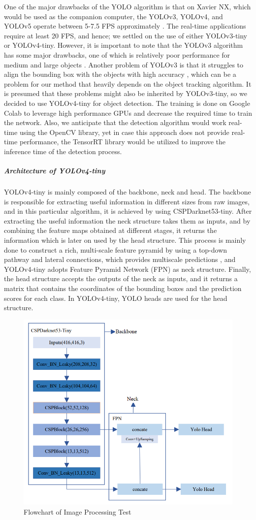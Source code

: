 \documentclass[12pt]{article}
\begin{document}
\justify One of the major drawbacks of the YOLO algorithm is that on Xavier NX, which would be used as the companion computer, the YOLOv3, YOLOv4, and YOLOv5 operate between 5-7.5 FPS approximately \cite{redmon2016you}. The real-time applications require at least 20 FPS, and hence; we settled on the use of either YOLOv3-tiny or YOLOv4-tiny. However, it is important to note that the YOLOv3 algorithm has some major drawbacks, one of which is relatively poor performance for medium and large objects \cite{zhang2018fast}. Another problem of YOLOv3 is that it struggles to align the bounding box with the objects with high accuracy \cite{zhang2018fast}, which can be a problem for our method that heavily depends on the object tracking algorithm. It is presumed that these problems might also be inherited by YOLOv3-tiny, so we decided to use YOLOv4-tiny for object detection. The training is done on Google Colab to leverage high performance GPUs and decrease the required time to train the network.  Also, we anticipate that the detection algorithm would work real-time using the OpenCV library, yet in case this approach does not provide real-time performance, the TensorRT library would be utilized to improve the inference time of the detection process.

\subparagraph*{Architecture of YOLOv4-tiny}

\justify YOLOv4-tiny is mainly composed of the backbone, neck and head. The backbone is responsible for extracting useful information in different sizes from raw images, and in this particular algorithm, it is achieved by using CSPDarknet53-tiny. After extracting the useful information the neck structure takes them as inputs, and by combining the feature maps obtained at different stages, it returns the information which is later on used by the head structure. This process is mainly done to construct a rich, multi-scale feature pyramid by using a top-down pathway and lateral connections, which provides multiscale predictions \cite{bertinetto2016fully}, and YOLOv4-tiny adopts Feature Pyramid Network (FPN) as neck structure. Finally, the head structure accepts the outputs of the neck as inputs, and it returns a matrix that contains the coordinates of the bounding boxes and the prediction scores for each class. In YOLOv4-tiny, YOLO heads are used for the head structure. 
\begin{figure}[ht]
\centering
 	\includegraphics[width = .6\linewidth]{ip_blockdiagram.png}
 	\caption{Flowchart of Image Processing Test \cite{lin2017focal}}
    \label{fig:moment}
\end{figure}
\end{document}
